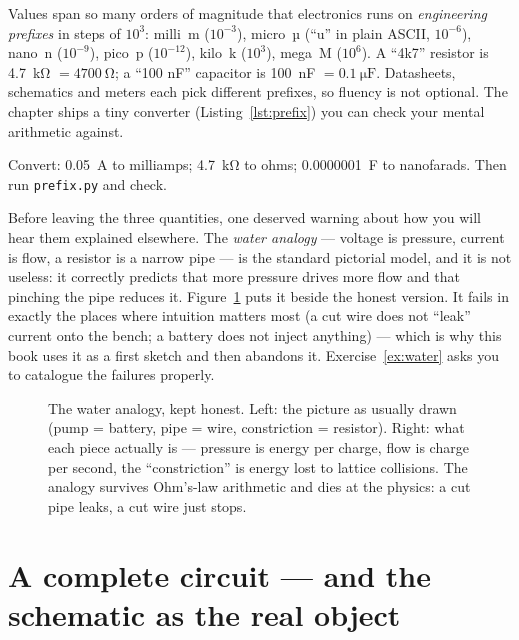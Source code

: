 Values span so many orders of magnitude that electronics runs on
\emph{engineering prefixes} in steps of $10^{3}$:
milli~m ($10^{-3}$), micro~µ (``u'' in plain ASCII, $10^{-6}$), nano~n
($10^{-9}$), pico~p ($10^{-12}$), kilo~k ($10^{3}$), mega~M ($10^{6}$). A
``4k7'' resistor is \qty{4.7}{\kilo\ohm} $= \qty{4700}{\ohm}$; a ``100 nF''
capacitor is \qty{100}{\nano\farad} $= \qty{0.1}{\micro\farad}$. Datasheets,
schematics and meters each pick different prefixes, so fluency is not optional.
The chapter ships a tiny converter (Listing~\ref{lst:prefix}) you can check your
mental arithmetic against.

\begin{exercise}[easy]
Convert: \qty{0.05}{\ampere} to milliamps; \qty{4.7}{\kilo\ohm} to ohms;
\qty{0.0000001}{\farad} to nanofarads. Then run \texttt{prefix.py} and check.
\end{exercise}

Before leaving the three quantities, one deserved warning about how you will
hear them explained elsewhere. The \emph{water analogy} —
voltage is pressure, current is flow, a resistor is a narrow pipe — is the
standard pictorial model, and it is not useless: it correctly predicts that
more pressure drives more flow and that pinching the pipe reduces it.
Figure~\ref{fig:analogy} puts it beside the honest version. It fails in
exactly the places where intuition matters most (a cut wire does not ``leak''
current onto the bench; a battery does not inject anything) — which is why
this book uses it as a first sketch and then abandons it.
Exercise~\ref{ex:water} asks you to catalogue the failures properly.

\begin{figure}[htbp]
\centering

\caption{The water analogy, kept honest. Left: the picture as usually drawn
(pump = battery, pipe = wire, constriction = resistor). Right: what each piece
actually is — pressure is energy per charge, flow is charge per second, the
``constriction'' is energy lost to lattice collisions. The analogy survives
Ohm's-law arithmetic and dies at the physics: a cut pipe leaks, a cut wire
just stops.}
\label{fig:analogy}
\end{figure}

\section{A complete circuit — and the schematic as the real object}
\label{sec:schematic}

